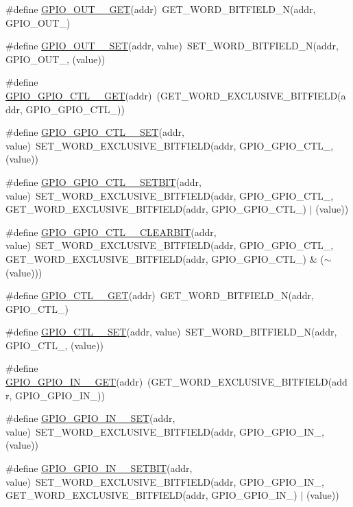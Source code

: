 \begin{DoxyCompactItemize}
\#define \hyperlink{a00554_a74697cc41579d2b68d7826c9dc96a189}{GPIO\_\-OUT\_\_\-GET}(addr)~GET\_\-WORD\_\-BITFIELD\_\-N(addr, GPIO\_\-OUT\_)
\item 
\#define \hyperlink{a00554_a2d449976c3c564c4383451c0b66d1bb6}{GPIO\_\-OUT\_\_\-SET}(addr, value)~SET\_\-WORD\_\-BITFIELD\_\-N(addr, GPIO\_\-OUT\_, (value))
\item 
\#define \hyperlink{a00554_a37c7c1162bd0d951cc7e99b9f978ed61}{GPIO\_\-GPIO\_\-CTL\_\_\-GET}(addr)~(GET\_\-WORD\_\-EXCLUSIVE\_\-BITFIELD(addr, GPIO\_\-GPIO\_\-CTL\_))
\item 
\#define \hyperlink{a00554_ab71d161dbc146154cce419333e88020d}{GPIO\_\-GPIO\_\-CTL\_\_\-SET}(addr, value)~SET\_\-WORD\_\-EXCLUSIVE\_\-BITFIELD(addr, GPIO\_\-GPIO\_\-CTL\_, (value))
\item 
\#define \hyperlink{a00554_a58b6293c4f02c078b050e2fdc94eb6e3}{GPIO\_\-GPIO\_\-CTL\_\_\-SETBIT}(addr, value)~SET\_\-WORD\_\-EXCLUSIVE\_\-BITFIELD(addr, GPIO\_\-GPIO\_\-CTL\_, GET\_\-WORD\_\-EXCLUSIVE\_\-BITFIELD(addr, GPIO\_\-GPIO\_\-CTL\_) $|$ (value))
\item 
\#define \hyperlink{a00554_a29810b7a694852515f67d912c5c9cf91}{GPIO\_\-GPIO\_\-CTL\_\_\-CLEARBIT}(addr, value)~SET\_\-WORD\_\-EXCLUSIVE\_\-BITFIELD(addr, GPIO\_\-GPIO\_\-CTL\_, GET\_\-WORD\_\-EXCLUSIVE\_\-BITFIELD(addr, GPIO\_\-GPIO\_\-CTL\_) \& ($\sim$(value)))
\item 
\#define \hyperlink{a00554_a4a604ec86aed184ef9fac67a26b90b3a}{GPIO\_\-CTL\_\_\-GET}(addr)~GET\_\-WORD\_\-BITFIELD\_\-N(addr, GPIO\_\-CTL\_)
\item 
\#define \hyperlink{a00554_ab21b11121b218859bbdeceefdd3de987}{GPIO\_\-CTL\_\_\-SET}(addr, value)~SET\_\-WORD\_\-BITFIELD\_\-N(addr, GPIO\_\-CTL\_, (value))
\item 
\#define \hyperlink{a00554_a1ea0ea0beee3d1670d08bf5dd3717cb4}{GPIO\_\-GPIO\_\-IN\_\_\-GET}(addr)~(GET\_\-WORD\_\-EXCLUSIVE\_\-BITFIELD(addr, GPIO\_\-GPIO\_\-IN\_))
\item 
\#define \hyperlink{a00554_a56fa65fcadfeb885242e6e503d8e0e60}{GPIO\_\-GPIO\_\-IN\_\_\-SET}(addr, value)~SET\_\-WORD\_\-EXCLUSIVE\_\-BITFIELD(addr, GPIO\_\-GPIO\_\-IN\_, (value))
\item 
\#define \hyperlink{a00554_a5b38ba353587c720a0c8f285d5efd749}{GPIO\_\-GPIO\_\-IN\_\_\-SETBIT}(addr, value)~SET\_\-WORD\_\-EXCLUSIVE\_\-BITFIELD(addr, GPIO\_\-GPIO\_\-IN\_, GET\_\-WORD\_\-EXCLUSIVE\_\-BITFIELD(addr, GPIO\_\-GPIO\_\-IN\_) $|$ (value))
\item 

\end{DoxyCompactItemize}
